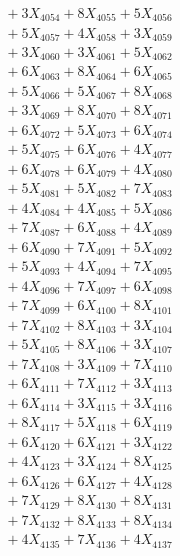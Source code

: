 \documentclass[a4paper,10pt]{article}
\begin{document}
{\begin{align}
&\;  + 3 X_{4054} + 8 X_{4055} + 5 X_{4056} \\[0.3ex]
&\;  + 5 X_{4057} + 4 X_{4058} + 3 X_{4059} \\[0.5ex]\allowbreak
&\;  + 3 X_{4060} + 3 X_{4061} + 5 X_{4062} \\[0.3ex]
&\;  + 6 X_{4063} + 8 X_{4064} + 6 X_{4065} \\[0.3ex]
&\;  + 5 X_{4066} + 5 X_{4067} + 8 X_{4068} \\[0.3ex]
&\;  + 3 X_{4069} + 8 X_{4070} + 8 X_{4071} \\[0.3ex]
&\;  + 6 X_{4072} + 5 X_{4073} + 6 X_{4074} \\[0.3ex]
&\;  + 5 X_{4075} + 6 X_{4076} + 4 X_{4077} \\[0.3ex]
&\;  + 6 X_{4078} + 6 X_{4079} + 4 X_{4080} \\[0.3ex]
&\;  + 5 X_{4081} + 5 X_{4082} + 7 X_{4083} \\[0.3ex]
&\;  + 4 X_{4084} + 4 X_{4085} + 5 X_{4086} \\[0.3ex]
&\;  + 7 X_{4087} + 6 X_{4088} + 4 X_{4089} \\[0.5ex]\allowbreak
&\;  + 6 X_{4090} + 7 X_{4091} + 5 X_{4092} \\[0.3ex]
&\;  + 5 X_{4093} + 4 X_{4094} + 7 X_{4095} \\[0.3ex]
&\;  + 4 X_{4096} + 7 X_{4097} + 6 X_{4098} \\[0.3ex]
&\;  + 7 X_{4099} + 6 X_{4100} + 8 X_{4101} \\[0.3ex]
&\;  + 7 X_{4102} + 8 X_{4103} + 3 X_{4104} \\[0.3ex]
&\;  + 5 X_{4105} + 8 X_{4106} + 3 X_{4107} \\[0.3ex]
&\;  + 7 X_{4108} + 3 X_{4109} + 7 X_{4110} \\[0.3ex]
&\;  + 6 X_{4111} + 7 X_{4112} + 3 X_{4113} \\[0.3ex]
&\;  + 6 X_{4114} + 3 X_{4115} + 3 X_{4116} \\[0.3ex]
&\;  + 8 X_{4117} + 5 X_{4118} + 6 X_{4119} \\[0.5ex]\allowbreak
&\;  + 6 X_{4120} + 6 X_{4121} + 3 X_{4122} \\[0.3ex]
&\;  + 4 X_{4123} + 3 X_{4124} + 8 X_{4125} \\[0.3ex]
&\;  + 6 X_{4126} + 6 X_{4127} + 4 X_{4128} \\[0.3ex]
&\;  + 7 X_{4129} + 8 X_{4130} + 8 X_{4131} \\[0.3ex]
&\;  + 7 X_{4132} + 8 X_{4133} + 8 X_{4134} \\[0.3ex]
&\;  + 4 X_{4135} + 7 X_{4136} + 4 X_{4137} \\[0.3ex]

\end{align}}
\end{document}
